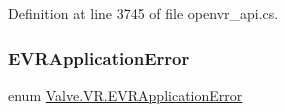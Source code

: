 Definition at line 3745 of file openvr\+\_\+api.\+cs.

\mbox{\label{namespace_valve_1_1_v_r_a3488adab8a219b579fcee50f4e63a8b6}} 
\subsubsection{\texorpdfstring{EVRApplicationError}{EVRApplicationError}}
{\footnotesize\ttfamily enum \mbox{\hyperlink{namespace_valve_1_1_v_r_a3488adab8a219b579fcee50f4e63a8b6}{Valve.\+V\+R.\+E\+V\+R\+Application\+Error}}\hspace{0.3cm}{\ttfamily [strong]}}


